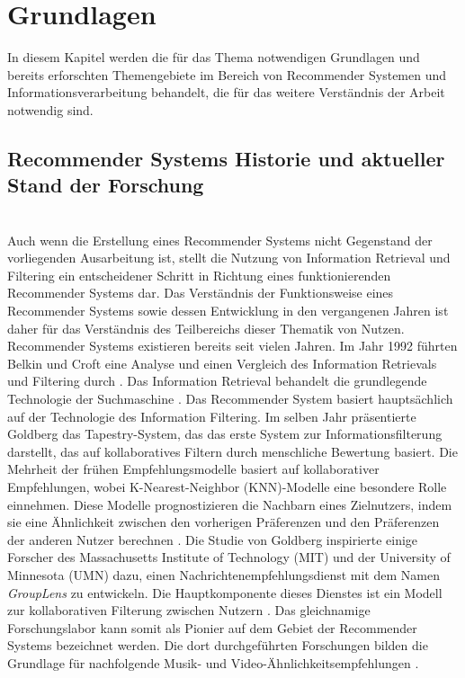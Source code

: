 \chapter{Grundlagen}
\label{chap:literaturüberblick}
In diesem Kapitel werden die für das Thema notwendigen Grundlagen und bereits erforschten Themengebiete im Bereich von Recommender Systemen und Informationsverarbeitung behandelt, die für das weitere Verständnis der Arbeit notwendig sind.\\
\section{Recommender Systems Historie und aktueller Stand der Forschung}
\\
Auch wenn die Erstellung eines Recommender Systems nicht Gegenstand der vorliegenden Ausarbeitung ist, stellt die Nutzung von Information Retrieval und Filtering ein entscheidener Schritt in Richtung eines funktionierenden Recommender Systems dar. Das Verständnis der Funktionsweise eines Recommender Systems sowie dessen Entwicklung in den vergangenen Jahren ist daher für das Verständnis des Teilbereichs dieser Thematik von Nutzen.\\

Recommender Systems existieren bereits seit vielen Jahren. Im Jahr 1992 führten Belkin und Croft eine Analyse und einen Vergleich des Information Retrievals und Filtering durch \cite{dong2022brief}. Das Information Retrieval behandelt die grundlegende Technologie der Suchmaschine \cite{dong2022brief}. Das Recommender System basiert hauptsächlich auf der Technologie des Information Filtering. Im selben Jahr präsentierte Goldberg das Tapestry-System, das das erste System zur Informationsfilterung darstellt, das auf kollaboratives Filtern durch menschliche Bewertung basiert. Die Mehrheit der frühen Empfehlungsmodelle basiert auf kollaborativer Empfehlungen, wobei K-Nearest-Neighbor (KNN)-Modelle eine besondere Rolle einnehmen. Diese Modelle prognostizieren die Nachbarn eines Zielnutzers, indem sie eine Ähnlichkeit zwischen den vorherigen Präferenzen und den Präferenzen der anderen Nutzer berechnen \cite{dong2022brief}. Die Studie von Goldberg inspirierte einige Forscher des Massachusetts Institute of Technology (MIT) und der University of Minnesota (UMN) dazu, einen Nachrichtenempfehlungsdienst mit dem Namen \emph{GroupLens} zu entwickeln. Die Hauptkomponente dieses Dienstes ist ein Modell zur kollaborativen Filterung zwischen Nutzern \cite{dong2022brief}. Das gleichnamige Forschungslabor kann somit als Pionier auf dem Gebiet der Recommender Systems bezeichnet werden. Die dort durchgeführten Forschungen bilden die Grundlage für nachfolgende Musik- und Video-Ähnlichkeitsempfehlungen \cite{dong2022brief}. \\

